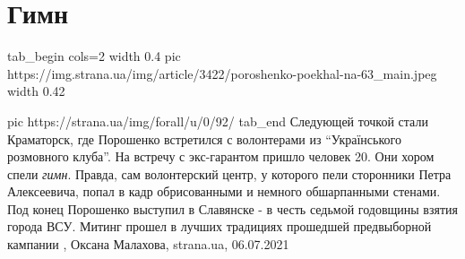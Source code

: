  
 
 
 
 
\chapter{Гимн}

\ifcmt
tab_begin cols=2
	width 0.4
	pic https://img.strana.ua/img/article/3422/poroshenko-poekhal-na-63_main.jpeg
	width 0.42

  pic https://strana.ua/img/forall/u/0/92/%
tab_end
\fi
Следующей точкой стали Краматорск, где Порошенко встретился с волонтерами из
\enquote{Українського розмовного клуба}. На встречу с экс-гарантом пришло
человек 20. Они хором спели \emph{гимн}. Правда, сам волонтерский центр, у
которого пели сторонники Петра Алексеевича, попал в кадр обрисованными и
немного обшарпанными стенами.  Под конец Порошенко выступил в Славянске - в
честь седьмой годовщины взятия города ВСУ. Митинг прошел в лучших традициях
прошедшей предвыборной кампании
, 
Оксана Малахова, strana.ua, 06.07.2021


